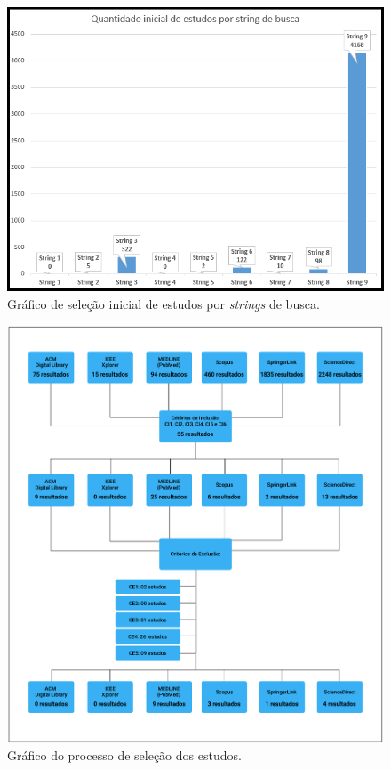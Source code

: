 \begin{figure}[htb]
	\caption{\label{fig_graficoSelecaoInicialEstudosStrings}Gráfico de seleção inicial de estudos por \textit{strings} de busca.}
	\begin{center}
	    \includegraphics[scale=0.63]{Imagens/grafico - selecao inicial de estudos por string.png}
	\end{center}
\end{figure}

\begin{figure}[htb]
	\caption{\label{fig_graficoProcessoInclusaoExclusaoArtigos}Gráfico do processo de seleção dos estudos.}
	\begin{center}
	    \includegraphics[scale=0.45]{Imagens/grafico - processo de selecao dos estudos.png}
	\end{center}
\end{figure}

